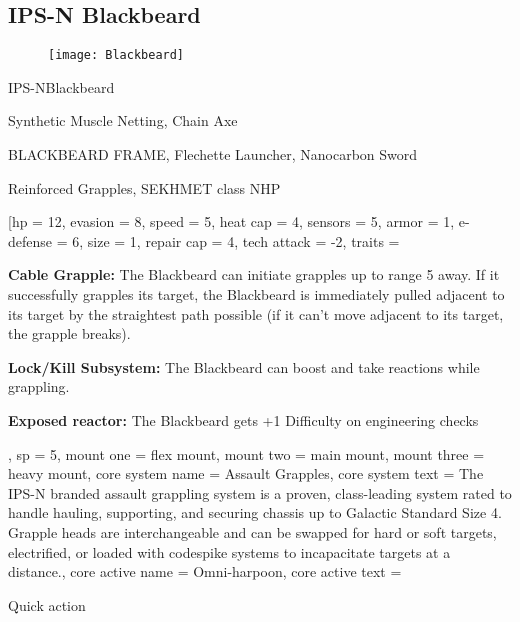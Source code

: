 \subsection{IPS-N Blackbeard}

\begin{figure}
\begin{center}
    \texttt{[image: Blackbeard]}
\end{center}
\end{figure}

\begin{mech}{IPS-N}{Blackbeard}


\begin{license}
\item Synthetic Muscle Netting, Chain Axe
\item BLACKBEARD FRAME, Flechette Launcher, Nanocarbon Sword
\item Reinforced Grapples, SEKHMET class NHP
\end{license}

\frameBox
[hp = 12,
evasion = 8,
speed = 5,
heat cap = 4,
sensors = 5,
armor = 1,
e-defense = 6,
size = 1,
repair cap = 4,
tech attack = -2,
traits = {\textbf{Cable Grapple:} The Blackbeard can initiate grapples up to range 5 away. If it successfully grapples its target, the Blackbeard is immediately pulled adjacent to its target by the straightest path possible (if it can’t move adjacent to its target, the grapple breaks).

\textbf{Lock/Kill Subsystem:} The Blackbeard can boost and take reactions while grappling.

\textbf{Exposed reactor:} The Blackbeard gets +1 Difficulty on engineering checks},
sp = 5,
mount one = flex mount,
mount two = main mount,
mount three = heavy mount,
core system name = Assault Grapples,
core system text = {The IPS-N branded assault grappling system is a proven, class-leading system rated to handle hauling, supporting, and securing chassis up to Galactic Standard Size 4. Grapple heads are interchangeable and can be swapped for hard or soft targets, electrified, or loaded with codespike systems to incapacitate targets at a distance.},
core active name = Omni-harpoon,
core active text = {Quick action

}
\end{mech}
